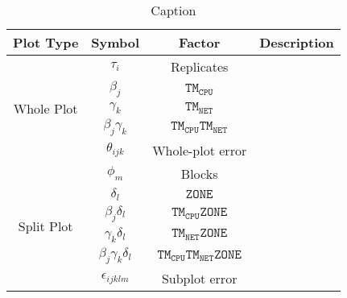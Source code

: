 \begin{table}[t!]
    \centering
    \begin{tabular}{|c|c|c|c|}
        \hline
        \textbf{Plot Type} & \textbf{Symbol} & \textbf{Factor} & \textbf{Description}  \\
        \hline
        \multirow{ 5}{*}{Whole Plot} & $\tau_i$ & Replicates &  \\
        \cline{2-4}
        & $\beta_j$ & $\mathtt{TM_{CPU}}$ & \\
        \cline{2-4}
         &$\gamma_k$ & $\mathtt{TM_{NET}}$ & \\
        \cline{2-4}
        & $\beta_j\gamma_k$ & $\mathtt{TM_{CPU}TM_{NET}}$ & \\
        \cline{2-4}
      & $\theta_{ijk}$ & Whole-plot error & \\
      \hline
      \multirow{ 6}{*}{Split Plot} & $\phi_m$ & Blocks &  \\
        \cline{2-4}
      & $\delta_l$ & $\mathtt{ZONE}$ &\\
      \cline{2-4}
    & $\beta_j\delta_l$ & $\mathtt{TM_{CPU}ZONE}$&  \\
        \cline{2-4}
    & $\gamma_k\delta_l$ & $\mathtt{TM_{NET}ZONE}$ &  \\
      \cline{2-4}
      & $\beta_j\gamma_k\delta_l$ & $\mathtt{TM_{CPU}TM_{NET}ZONE}$ & \\
      \cline{2-4}
      & $\epsilon_{ijklm}$ & Subplot error & \\
      \hline
       \hline
    \end{tabular}
    \caption{Caption}
    \label{tab:my_label}
\end{table}